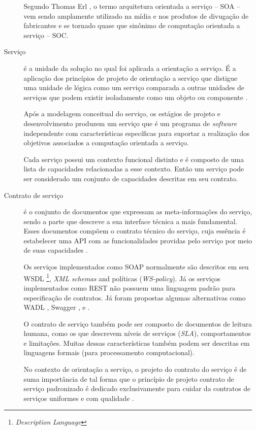 \begin{description}
Segundo Thomas Erl \cite{erl2009web}, o termo arquitetura orientada a serviço --
SOA -- vem sendo amplamente utilizado na mídia e nos produtos de divugação de
fabricantes e se tornado quase que sinônimo de computação orientada a
serviço -- SOC.

\item [Serviço] é a unidade da solução no qual foi aplicada a orientação a
serviço. É a aplicação dos princípios de projeto de orientação a
serviço que distigue uma unidade de lógica como um serviço comparada a outras
unidades de serviços que podem existir isoladamente como um objeto ou
componente \cite{erl2009web}.

Após a modelagem conceitual do serviço, os estágios de projeto e desenvolvimento
produzem um serviço que é um programa de \textit{software} independente com
características específicas para suportar a realização dos objetivos associados
a computação orientada a serviço.

Cada serviço possui um contexto funcional distinto e é composto de uma lista
de capacidades relacionadas a esse contexto. Então um serviço pode ser
considerado um conjunto de capacidades descritas em seu contrato.


\item [Contrato de serviço] é o conjunto de documentos que expressam as
meta-informações do serviço, sendo a parte que descreve a
sua interface técnica a mais fundamental. Esses documentos compõem o contrato
técnico do serviço, cuja essência é estabelecer uma API com as funcionalidades providas pelo serviço por meio de
suas capacidades \cite{erl2009web}.

Os serviços implementados como \ws{} SOAP normalmente são descritos em seu WSDL
\footnote{\ws{} \textit{Description Language}}, \textit{XML schemas} and
políticas (\textit{WS-policy}). Já os serviços implementados como \ws{} REST não
possuem uma linguagem padrão para especificação de contratos. Já foram propostas
algumas alternativas como WADL \cite{hadley2006web}, Swagger \cite{swaggerSite},
e \neoidl{} \cite{lima2015neoidl}.

O contrato de serviço também pode ser composto de documentos de leitura humana,
como os que descrevem níveis de serviços (\textit{SLA}), comportamentos e
limitações. Muitas dessas características também podem ser descritas em
linguagens formais (para processamento computacional).

No contexto de orientação a serviço, o projeto do contrato do serviço é de suma
importância de tal forma que o princípio de projeto contrato de serviço
padronizado é dedicado exclusivamente para cuidar da contratos de serviços
uniformes e com qualidade \cite{erl2009web}.

\end{description}



